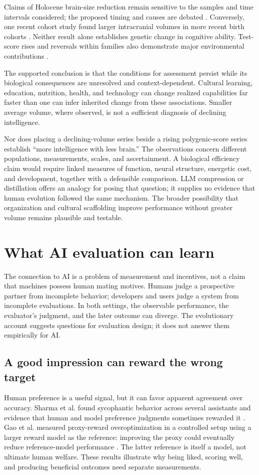 \documentclass[10pt,twocolumn,letterpaper]{article}
\begin{document}
Claims of Holocene brain-size reduction remain sensitive to the samples and time intervals considered; the proposed timing and causes are debated \citep{desilva2021,villmoare,desilva2023}. Conversely, one recent cohort study found larger intracranial volumes in more recent birth cohorts \citep{decarli}. Neither result alone establishes genetic change in cognitive ability. Test-score rises and reversals within families also demonstrate major environmental contributions \citep{bratsberg}.

The supported conclusion is that the conditions for assessment persist while its biological consequences are unresolved and context-dependent. Cultural learning, education, nutrition, health, and technology can change realized capabilities far faster than one can infer inherited change from these associations. Smaller average volume, where observed, is not a sufficient diagnosis of declining intelligence.

Nor does placing a declining-volume series beside a rising polygenic-score series establish ``more intelligence with less brain.'' The observations concern different populations, measurements, scales, and ascertainment. A biological efficiency claim would require linked measures of function, neural structure, energetic cost, and development, together with a defensible comparison. LLM compression or distillation offers an analogy for posing that question; it supplies no evidence that human evolution followed the same mechanism. The broader possibility that organization and cultural scaffolding improve performance without greater volume remains plausible and testable.

\section{What AI evaluation can learn}
The connection to AI is a problem of measurement and incentives, not a claim that machines possess human mating motives. Humans judge a prospective partner from incomplete behavior; developers and users judge a system from incomplete evaluations. In both settings, the observable performance, the evaluator's judgment, and the later outcome can diverge. The evolutionary account suggests questions for evaluation design; it does not answer them empirically for AI.

\subsection{A good impression can reward the wrong target}
Human preference is a useful signal, but it can favor apparent agreement over accuracy. Sharma et al. found sycophantic behavior across several assistants and evidence that human and model preference judgments sometimes rewarded it \citep{sharma2024}. Gao et al. measured proxy-reward overoptimization in a controlled setup using a larger reward model as the reference: improving the proxy could eventually reduce reference-model performance \citep{gao2023}. The latter reference is itself a model, not ultimate human welfare. These results illustrate why being liked, scoring well, and producing beneficial outcomes need separate measurements.
\end{document}
